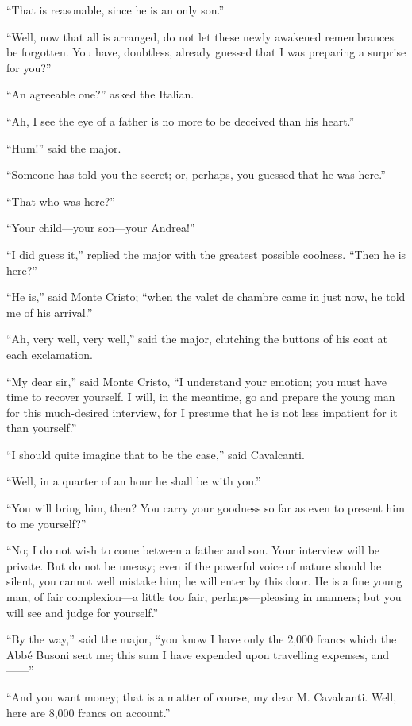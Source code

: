 “That is reasonable, since he is an only son.”

“Well, now that all is arranged, do not let these newly awakened
remembrances be forgotten. You have, doubtless, already guessed that I
was preparing a surprise for you?”

“An agreeable one?” asked the Italian.

“Ah, I see the eye of a father is no more to be deceived than his
heart.”

“Hum!” said the major.

“Someone has told you the secret; or, perhaps, you guessed that he was
here.”

“That who was here?”

“Your child—your son—your Andrea!”

“I did guess it,” replied the major with the greatest possible
coolness. “Then he is here?”

“He is,” said Monte Cristo; “when the valet de chambre came in just
now, he told me of his arrival.”

“Ah, very well, very well,” said the major, clutching the buttons of
his coat at each exclamation.

“My dear sir,” said Monte Cristo, “I understand your emotion; you must
have time to recover yourself. I will, in the meantime, go and prepare
the young man for this much-desired interview, for I presume that he is
not less impatient for it than yourself.”

“I should quite imagine that to be the case,” said Cavalcanti.

“Well, in a quarter of an hour he shall be with you.”

“You will bring him, then? You carry your goodness so far as even to
present him to me yourself?”

“No; I do not wish to come between a father and son. Your interview
will be private. But do not be uneasy; even if the powerful voice of
nature should be silent, you cannot well mistake him; he will enter by
this door. He is a fine young man, of fair complexion—a little too
fair, perhaps—pleasing in manners; but you will see and judge for
yourself.”

“By the way,” said the major, “you know I have only the 2,000 francs
which the Abbé Busoni sent me; this sum I have expended upon travelling
expenses, and——”

“And you want money; that is a matter of course, my dear M. Cavalcanti.
Well, here are 8,000 francs on account.”

